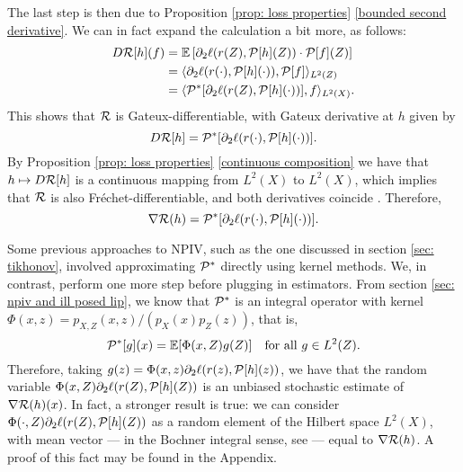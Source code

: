 The last step is then due to Proposition \ref{prop: loss properties} \ref{bounded second derivative}.
We can in fact expand the calculation a bit more, as follows:
\begin{align*}
    D \mathcal{R} [ h ] ( f )
    &= \mathbb{E} \left[
        \partial_{ 2 } \ell ( r ( Z ), \mathcal{P} [ h ] ( Z ) ) \cdot \mathcal{P} [ f ] ( Z )
    \right] \\
    &= \langle  \partial_{ 2 } \ell ( r ( \cdot ), \mathcal{P} [ h ] ( \cdot ) ), \mathcal{P} [ f ]  \rangle_{ L^{ 2 } ( Z ) } \\
    &= \langle  \mathcal{P}^{ * } [ \partial_{ 2 } \ell ( r ( Z ), \mathcal{P} [ h ] ( \cdot ) ) ], f  \rangle_{ L^{ 2 } ( X ) }
.\end{align*}
This shows that $ \mathcal{R} $ is Gateux-differentiable, with Gateux derivative at $ h $ given by
\begin{equation*}
    D \mathcal{R} [ h ] = \mathcal{P}^{ * } [ \partial_{ 2 } \ell ( r ( \cdot ), \mathcal{P} [ h ] ( \cdot ) ) ]
.\end{equation*}
By Proposition \ref{prop: loss properties} \ref{continuous composition} we have that $ h \mapsto D \mathcal{R} [ h ] $ is a continuous mapping from $ L^{ 2 } ( X ) $ to $ L^{ 2 } ( X ) $, which implies that $ \mathcal{R} $ is also Fréchet-differentiable, and both derivatives coincide \cite[Theorem~3.3]{pathak2018}.
Therefore,
\begin{equation}
    \label{eq: risk gradient}
   \nabla \mathcal{R} ( h ) = \mathcal{P}^{ * } [ \partial_{ 2 } \ell ( r ( \cdot ), \mathcal{P} [ h ] ( \cdot ) ) ]  
.\end{equation}

Some previous approaches to NPIV, such as the one discussed in section \ref{sec: tikhonov}, involved approximating $ \mathcal{P}^{ * } $ directly using kernel methods.
We, in contrast, perform one more step before plugging in estimators.
From section \ref{sec: npiv and ill posed lip}, we know that $ \mathcal{P}^{ * } $ is an integral operator with kernel $ \Phi ( x, z ) = p_{ X, Z } ( x, z ) / ( p_{ X } ( x ) p_{ Z } ( z ) ) $, that is,
\begin{equation*}
    \mathcal{P}^{ * } [ g ] ( x ) = \mathbb{E} [ \Phi ( x, Z ) g ( Z ) ] \quad \text{for all } g \in L^2 ( Z )
.\end{equation*}
Therefore, taking $ g ( z ) = \Phi ( x, z ) \partial_{ 2 } \ell ( r ( z ), \mathcal{P} [ h ] ( z ) ) $, we have that the random variable $ \Phi ( x, Z ) \partial_{ 2 } \ell ( r ( Z ), \mathcal{P} [ h ] ( Z ) ) $ is an unbiased stochastic estimate of $ \nabla \mathcal{R} ( h ) ( x ) $.
In fact, a stronger result is true: we can consider $ \Phi ( \cdot, Z ) \partial_{ 2 } \ell ( r ( Z ), \mathcal{P} [ h ] ( Z ) ) $ as a random element of the Hilbert space $ L^2 ( X ) $, with mean vector --- in the Bochner integral sense, see \cite[Chapter~7]{hsing2015} --- equal to $ \nabla \mathcal{R} ( h ) $.
A proof of this fact may be found in the Appendix.

